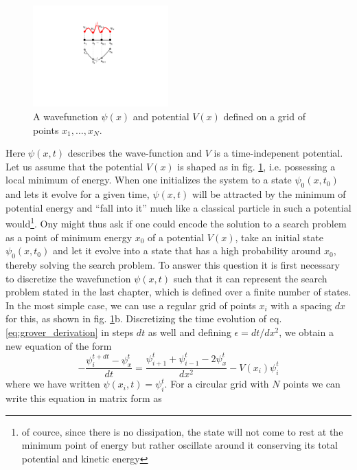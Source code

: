\begin{figure}
\vspace{-1cm}
\includegraphics[width=5.2cm]{"./material/papers/grover/grover_derivation_schroedinger"}
\caption{A wavefunction $\psi(x)$ and potential $V(x)$ defined on a grid of points $x_1,\hdots,x_N$.}
\label{fig:GroverDerivationSchroedinger}
\end{figure}


Here $\psi(x,t)$ describes the wave-function and $V$ is a time-indepenent potential. Let us assume that the potential $V(x)$ is shaped as in fig. \ref{fig:GroverDerivationSchroedinger}, i.e. possessing a local minimum of energy. When one initializes the system to a state $\psi_0(x,t_0)$ and lets it evolve for a given time, $\psi(x,t)$ will be attracted by the minimum of potential energy and ``fall into it'' much like a classical particle in such a potential would\footnote{of cource, since there is no dissipation, the state will not come to rest at the minimum point of energy but rather oscillate around it conserving its total potential and kinetic energy}. Ony might thus ask if one could encode the solution to a search problem as a point of minimum energy $x_0$ of a potential $V(x)$, take an initial state $\psi_0(x,t_0)$ and let it evolve into a state that has a high probability around $x_0$, thereby solving the search problem. To answer this question it is first necessary to discretize the wavefunction $\psi(x,t)$ such that it can represent the search problem stated in the last chapter, which is defined over a finite number of states. In the most simple case, we can use a regular grid of points $x_i$ with a spacing $dx$ for this, as shown in fig. \ref{fig:GroverDerivationSchroedinger}b. Discretizing the time evolution of eq. \ref{eq:grover_derivation} in steps $dt$ as well and defining $\epsilon = dt/dx^2$, we obtain a new equation of the form
%
\begin{equation}
-\frac{\psi_i^{t+dt}-\psi_x^{t}}{dt} = \frac{\psi_{i+1}^t+\psi_{i-1}^t-2\psi_x^t}{dx^2} -V(x_i)\psi_i^t
\end{equation}
%
where we have written $\psi(x_i,t)=\psi_i^t$. For a circular grid with $N$ points we can write this equation in matrix form as
